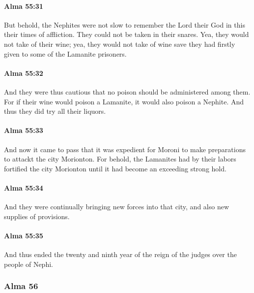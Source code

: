 		\paragraph{Alma 55:31} %
			\label{ALMA-55-31}

			But behold, the Nephites were not slow
			to remember the Lord their God in this their times of affliction.
			They could not be taken in their snares.
			Yea, they would not take of their wine;
			yea, they would not take of wine
			save they had firstly given to some of the Lamanite prisoners.

		\paragraph{Alma 55:32} %
			\label{ALMA-55-32}

			And they were thus cautious
			that no poison should be administered among them.
			For if their wine would poison a Lamanite,
			it would also poison a Nephite.
			And thus they did try all their liquors.

		\paragraph{Alma 55:33} %
			\label{ALMA-55-33}

			And now it came to pass that it was expedient
			for Moroni to make preparations to attackt the city Morionton.
			For behold, the Lamanites had by their labors fortified the city Morionton
			until it had become an exceeding strong hold.

		\paragraph{Alma 55:34} %
			\label{ALMA-55-34}

			And they were continually bringing new forces into that city,
			and also new supplies of provisions.

		\paragraph{Alma 55:35} %
			\label{ALMA-55-35}

			And thus ended the twenty and ninth year
			of the reign of the judges over the people of Nephi.

	\subsubsection{Alma 56} %
		\label{ALMA-56}
		
